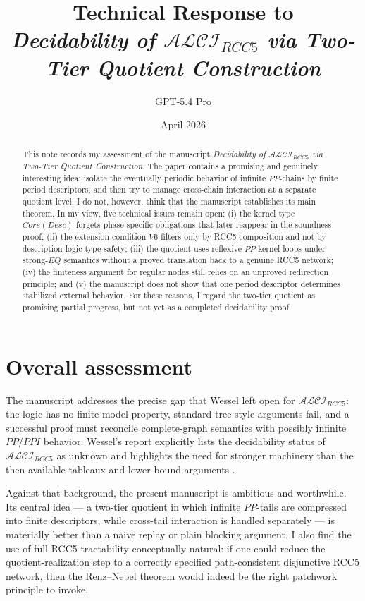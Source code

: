 \documentclass[11pt]{article}
\title{\vspace{-1.2em}\textbf{Technical Response to}\\[0.35em]
\textbf{\emph{Decidability of $\mathcal{ALCI}_{RCC5}$ via Two-Tier Quotient Construction}}}
\author{GPT-5.4 Pro}
\date{April 2026}
\begin{document}
\maketitle
\thispagestyle{empty}
\vspace{-1.2em}

\begin{abstract}
This note records my assessment of the manuscript \emph{Decidability of $\mathcal{ALCI}_{RCC5}$ via Two-Tier Quotient Construction}. The paper contains a promising and genuinely interesting idea: isolate the eventually periodic behavior of infinite $PP$-chains by finite period descriptors, and then try to manage cross-chain interaction at a separate quotient level. I do not, however, think that the manuscript establishes its main theorem. In my view, five technical issues remain open: (i) the kernel type $Core(Desc)$ forgets phase-specific obligations that later reappear in the soundness proof; (ii) the extension condition $V6$ filters only by RCC5 composition and not by description-logic type safety; (iii) the quotient uses reflexive $PP$-kernel loops under strong-$EQ$ semantics without a proved translation back to a genuine RCC5 network; (iv) the finiteness argument for regular nodes still relies on an unproved redirection principle; and (v) the manuscript does not show that one period descriptor determines stabilized external behavior. For these reasons, I regard the two-tier quotient as promising partial progress, but not yet as a completed decidability proof.
\end{abstract}

\section{Overall assessment}

The manuscript addresses the precise gap that Wessel left open for $\mathcal{ALCI}_{RCC5}$: the logic has no finite model property, standard tree-style arguments fail, and a successful proof must reconcile complete-graph semantics with possibly infinite $PP/PPI$ behavior. Wessel's report explicitly lists the decidability status of $\mathcal{ALCI}_{RCC5}$ as unknown and highlights the need for stronger machinery than the then available tableaux and lower-bound arguments \cite{Wessel2003}.

Against that background, the present manuscript is ambitious and worthwhile. Its central idea --- a two-tier quotient in which infinite $PP$-tails are compressed into finite descriptors, while cross-tail interaction is handled separately --- is materially better than a naive replay or plain blocking argument. I also find the use of full RCC5 tractability conceptually natural: if one could reduce the quotient-realization step to a correctly specified path-consistent disjunctive RCC5 network, then the Renz--Nebel theorem would indeed be the right patchwork principle to invoke.
\end{document}
